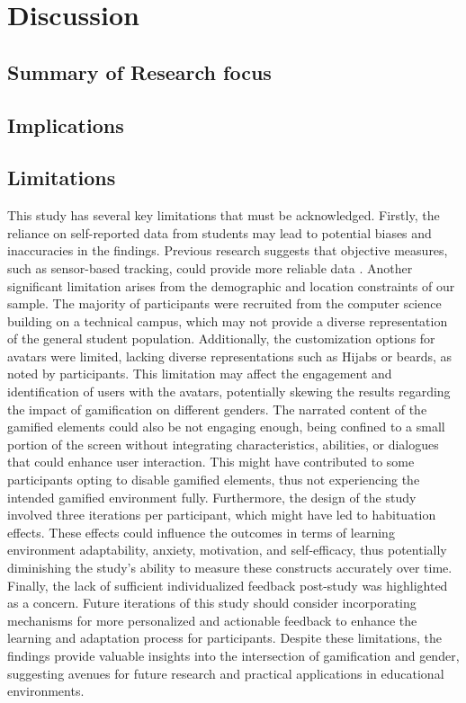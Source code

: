 \section{Discussion}
\subsection{Summary of Research focus}
\subsection{Implications}



\subsection{Limitations}
This study has several key limitations that must be acknowledged. Firstly, the reliance on self-reported data from students may lead to potential biases and inaccuracies in the findings. Previous research suggests that objective measures, such as sensor-based tracking, could provide more reliable data \parencite{woolfAffectiveTutorsAutomatic2010}.
Another significant limitation arises from the demographic and location constraints of our sample. The majority of participants were recruited from the computer science building on a technical campus, which may not provide a diverse representation of the general student population.
Additionally, the customization options for avatars were limited, lacking diverse representations such as Hijabs or beards, as noted by participants. This limitation may affect the engagement and identification of users with the avatars, potentially skewing the results regarding the impact of gamification on different genders.
The narrated content of the gamified elements could also be not engaging enough, being confined to a small portion of the screen without integrating characteristics, abilities, or dialogues that could enhance user interaction. This might have contributed to some participants opting to disable gamified elements, thus not experiencing the intended gamified environment fully.
Furthermore, the design of the study involved three iterations per participant, which might have led to habituation effects. These effects could influence the outcomes in terms of learning environment adaptability, anxiety, motivation, and self-efficacy, thus potentially diminishing the study's ability to measure these constructs accurately over time.
Finally, the lack of sufficient individualized feedback post-study was highlighted as a concern. Future iterations of this study should consider incorporating mechanisms for more personalized and actionable feedback to enhance the learning and adaptation process for participants.
Despite these limitations, the findings provide valuable insights into the intersection of gamification and gender, suggesting avenues for future research and practical applications in educational environments.

